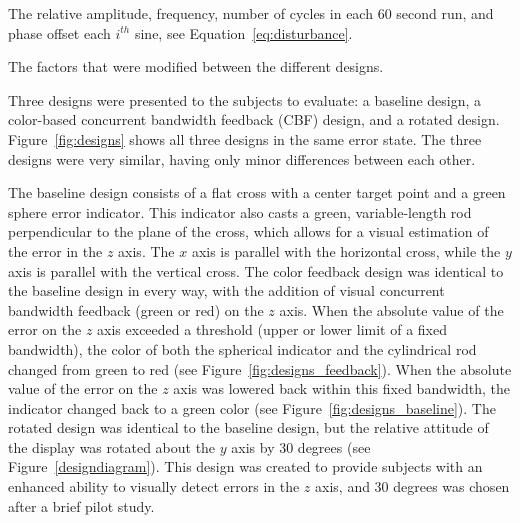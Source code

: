 \begin{table}[tb]
    \centering
    \caption[Disturbance force characteristics]{The relative amplitude, frequency, number of cycles in each 60 second run, and phase offset each $i^{th}$ sine, see Equation~\ref{eq:disturbance}.}
    \label{sine-table}
\end{table}

\begin{table}[tb]
    \centering
    \caption[The factors that were modified between the different designs]{The factors that were modified between the different designs.}
    \label{tab:designs}
\end{table}

Three designs were presented to the subjects to evaluate: a baseline design, a color-based concurrent bandwidth feedback (CBF) design, and a rotated design.
Figure~\ref{fig:designs} shows all three designs in the same error state.
The three designs were very similar, having only minor differences between each other.

The baseline design consists of a flat cross with a center target point and a green sphere error indicator.
This indicator also casts a green, variable-length rod perpendicular to the plane of the cross, which allows for a visual estimation of the error in the $z$ axis.
The $x$ axis is parallel with the horizontal cross, while the $y$ axis is parallel with the vertical cross.
The color feedback design was identical to the baseline design in every way, with the addition of visual concurrent bandwidth feedback (green or red) on the $z$ axis.
When the absolute value of the error on the $z$ axis exceeded a threshold (upper or lower limit of a fixed bandwidth), the color of both the spherical indicator and the cylindrical rod changed from green to red (see Figure~\ref{fig:designs_feedback}).
When the absolute value of the error on the $z$ axis was lowered back within this fixed bandwidth, the indicator changed back to a green color (see Figure~\ref{fig:designs_baseline}).
The rotated design was identical to the baseline design, but the relative attitude of the display was rotated about the $y$ axis by 30 degrees (see Figure~\ref{designdiagram}).
This design was created to provide subjects with an enhanced ability to visually detect errors in the $z$ axis, and 30 degrees was chosen after a brief pilot study.

